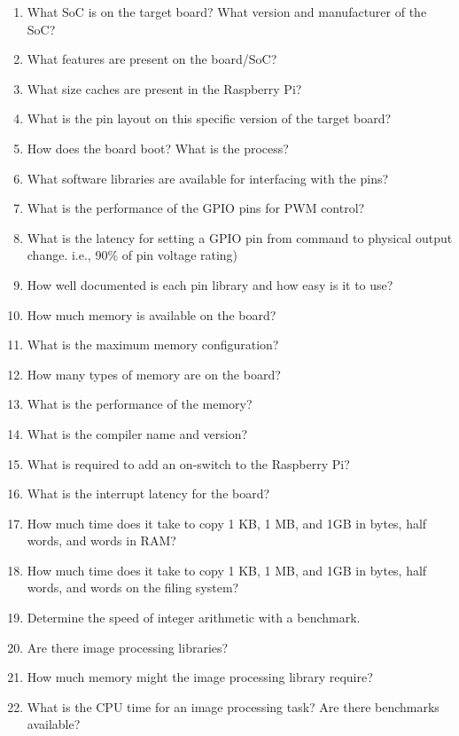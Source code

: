 \documentclass[journal]{IEEEtran}
\begin{document}
    \begin{enumerate}
        \item What SoC is on the target board? What version and manufacturer of the SoC?
        \item What features are present on the board/SoC?
        \item What size caches are present in the Raspberry Pi?
        \item What is the pin layout on this specific version of the target board?
        \item How does the board boot? What is the process?
        \item What software libraries are available for interfacing with the pins?
        \item What is the performance of the GPIO pins for PWM control?
        \item What is the latency for setting a GPIO pin from command to physical output change. i.e., 90\% of pin voltage rating)
        \item How well documented is each pin library and how easy is it to use?
        \item How much memory is available on the board?
        \item What is the maximum memory configuration?
        \item How many types of memory are on the board?
        \item What is the performance of the memory?
        \item What is the compiler name and version?
        \item What is required to add an on-switch to the Raspberry Pi?
        \item What is the interrupt latency for the board?
        \item How much time does it take to copy 1 KB, 1 MB, and 1GB in bytes, half words, and words in RAM?
        \item How much time does it take to copy 1 KB, 1 MB, and 1GB in bytes, half words, and words on the
        ﬁling system?
        \item Determine the speed of integer arithmetic with a benchmark.
        \item Are there image processing libraries?
        \item How much memory might the image processing library require?
        \item What is the CPU time for an image processing task? Are there benchmarks available?
        

\end{enumerate}
\end{document}
